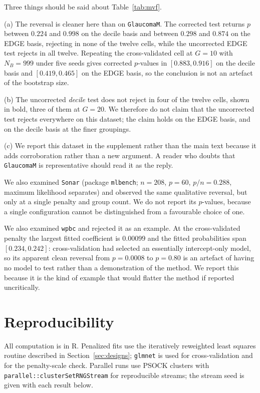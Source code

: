 \documentclass[11pt,a4paper]{article}
\theoremstyle{plain}
\theoremstyle{remark}
\begin{document}
Three things should be said about Table~\ref{tab:mvf}.

(a) The reversal is cleaner here than on \texttt{GlaucomaM}. The corrected test returns
$p$ between $0.224$ and $0.998$ on the decile basis and between $0.298$ and $0.874$ on
the EDGE basis, rejecting in none of the twelve cells, while the uncorrected EDGE test
rejects in all twelve. Repeating the cross-validated cell at $G = 10$ with $N_B = 999$
under five seeds gives corrected $p$-values in $[0.883, 0.916]$ on the decile basis and
$[0.419, 0.465]$ on the EDGE basis, so the conclusion is not an artefact of the bootstrap
size.

(b) The uncorrected \emph{decile} test does not reject in four of the twelve cells,
shown in bold, three of them at $G = 20$. We therefore do not claim that the uncorrected
test rejects everywhere on this dataset; the claim holds on the EDGE basis, and on the
decile basis at the finer groupings.

(c) We report this dataset in the supplement rather than the main text because it adds
corroboration rather than a new argument. A reader who doubts that \texttt{GlaucomaM} is
representative should read it as the reply.

We also examined \texttt{Sonar} (package \texttt{mlbench}; $n = 208$, $p = 60$,
$p/n = 0.288$, maximum likelihood separates) and observed the same qualitative reversal,
but only at a single penalty and group count. We do not report its $p$-values, because a
single configuration cannot be distinguished from a favourable choice of one.

We also examined \texttt{wpbc} and rejected it as an example. At the cross-validated
penalty the largest fitted coefficient is $0.00099$ and the fitted probabilities span
$[0.234, 0.242]$: cross-validation had selected an essentially intercept-only model, so
its apparent clean reversal from $p = 0.0008$ to $p = 0.80$ is an artefact of having no
model to test rather than a demonstration of the method. We report this because it is the
kind of example that would flatter the method if reported uncritically.


\section{Reproducibility}\label{sec:repro}

All computation is in R. Penalized fits use the iteratively reweighted least squares
routine described in Section~\ref{sec:designs}; \texttt{glmnet} \citep{friedman2010} is
used for cross-validation and for the penalty-scale check. Parallel runs use PSOCK
clusters with \texttt{parallel::clusterSetRNGStream} for reproducible streams; the stream
seed is given with each result below.
\end{document}
